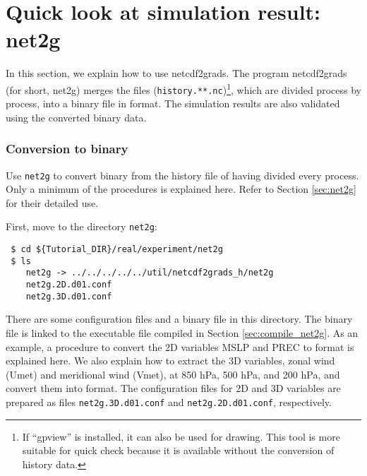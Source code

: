 \section{Quick look at simulation result: net2g} \label{sec:quicklook}

In this section, we explain how to use netcdf2grads. The program netcdf2grads (for short, net2g) merges the \netcdf files (\verb|history.**.nc|)\footnote{If ``gpview'' is installed, it can also be used for drawing. This tool is more suitable for quick check  because it is available without the conversion of history data.},  which are divided process by process, into a binary file in \grads format. The simulation results are also validated using the converted \grads binary data.

\subsubsection{Conversion to \grads binary}
Use \verb|net2g| to convert \grads binary from the history file of \netcdf having divided every process.  Only a minimum of the procedures is explained here.  Refer to Section \ref{sec:net2g} for their detailed use.

First, move to the directory \verb|net2g|:
\begin{verbatim}
 $ cd ${Tutorial_DIR}/real/experiment/net2g
 $ ls
    net2g -> ../../../../../util/netcdf2grads_h/net2g
    net2g.2D.d01.conf
    net2g.3D.d01.conf
\end{verbatim}
There are some configuration files and a binary file in this directory.  The binary file is linked to the executable file compiled in Section \ref{sec:compile_net2g}. As an example,  a procedure to convert the 2D variables MSLP and PREC to \grads format is explained here. We also explain how to extract the 3D variables, zonal wind (Umet) and meridional wind (Vmet), at 850 hPa, 500 hPa, and 200 hPa, and convert them into \grads format.  The configuration files for 2D and 3D variables  are prepared as files \verb|net2g.3D.d01.conf| and \verb|net2g.2D.d01.conf|, respectively.
 
